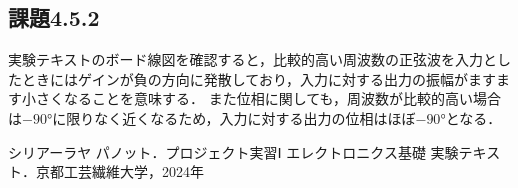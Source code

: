 \documentclass{jlreq}
\numberwithin{equation}{section}
\begin{document}
\subsection*{課題4.5.2}
実験テキストのボード線図を確認すると，比較的高い周波数の正弦波を入力としたときにはゲインが負の方向に発散しており，入力に対する出力の振幅がますます小さくなることを意味する．
また位相に関しても，周波数が比較的高い場合は$-90 \si{\degree}$に限りなく近くなるため，入力に対する出力の位相はほぼ$-90 \si{\degree}$となる．

\begin{thebibliography}{9}
  \item シリアーラヤ パノット．プロジェクト実習Ⅰ エレクトロニクス基礎 実験テキスト．京都工芸繊維大学，2024年
\end{thebibliography}
\end{document}

